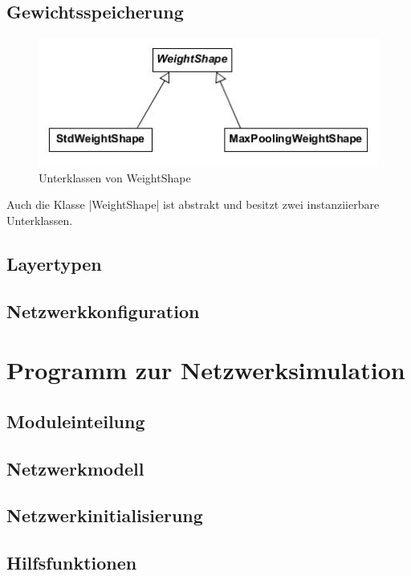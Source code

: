 \documentclass[../main.tex]{subfiles}
\begin{document}
\subsection{Gewichtsspeicherung}
\begin{figure}
	\centering 
	\includegraphics[width=\textwidth]{../images/Schmidt/cd_netdesc_weightshapes.jpg} 
	\caption {Unterklassen von WeightShape}
	\label{pic:cd_Netdesc_weightshapes} 
\end{figure} 
Auch die Klasse |WeightShape| ist abstrakt und besitzt zwei instanziierbare Unterklassen. 

\subsection{Layertypen}

\subsection{Netzwerkkonfiguration}



\section{Programm zur Netzwerksimulation}

\subsection{Moduleinteilung}

\subsection{Netzwerkmodell}

\subsection{Netzwerkinitialisierung}

\subsection{Hilfsfunktionen}
\end{document}
